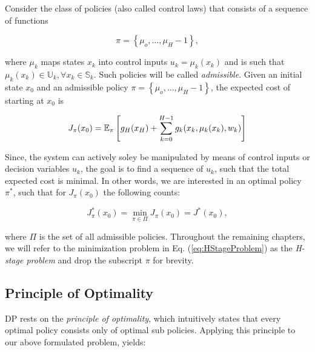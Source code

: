 Consider the class of policies (also called control laws) that consists of a
sequence of functions 

\begin{equation}
  \pi = \left\{\mu_o,\dots,\mu_H-1\right\},
\end{equation}

where $\mu_k$ maps states $x_k$ into control inputs $u_k = \mu_k(x_k)$ and is
such that $\mu_k(x_k) \in \mathbb{U}_k, \forall x_k \in \mathbb{S}_k$. Such
policies will be called \textit{admissible}. Given an initial state $x_0$ and an
admissible policy $\pi = \left\{\mu_o,\dots,\mu_H-1\right\}$, the expected cost
of starting at $x_0$ is

\begin{equation}
  J_\pi(x_0) = \mathbb{E}_\pi\left[g_H(x_H) + \sum\limits_{k=0}^{H-1}{g_k(x_k, \mu_k(x_k), w_k)}\right]
\end{equation}

Since, the system can actively soley be manipulated by means of control inputs
or decision variables $u_k$, the goal is to find a sequence of $u_k$, such that
the total expected cost is minimal. In other words, we are interested in an
optimal policy $\pi^*$, such that for $J_\pi(x_0)$ the following counts:

\begin{equation}
  J_\pi^*(x_0) = \min_{\pi\in\Pi}J_\pi(x_0) = J^*(x_0), \label{eq:HStageProblem}
\end{equation}

where $\Pi$ is the set of all admissible policies. Throughout the remaining
chapters, we will refer to the minimization problem in Eq.
(\ref{eq:HStageProblem}) as the \textit{H-stage problem} and drop the subscript
$\pi$ for brevity.

\subsection*{Principle of Optimality}
DP rests on the \textit{principle of optimality}, which intuitively states that
every optimal policy consists only of optimal sub policies. Applying this
principle to our above formulated problem, yields: 

\begin{center}
\end{center}

